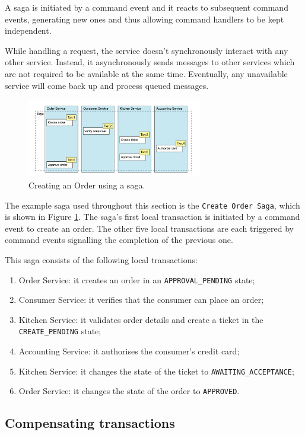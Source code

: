 \documentclass[conference]{IEEEtran}
\begin{document}
A saga is initiated by a command event and it reacts to subsequent command events, generating new ones and thus allowing command handlers to be kept independent.

While handling a request, the service doesn’t synchronously interact with any other service. Instead, it asynchronously sends messages to other services which are not required to be available at the same time. Eventually, any unavailable service will come back up and process queued messages.

\begin{figure}[!htbp]
\centering
\includegraphics[width=3in]{jpeg/order-saga}
\caption{Creating an Order using a saga. \cite{microservices-patterns-saga}}
\label{order_saga}
\end{figure}

The example saga used throughout this section is the \texttt{Create Order Saga}, which is shown in Figure \ref{order_saga}. The saga’s first local transaction is initiated by a command event to create an order. The other five local transactions are each triggered by command events signalling the completion of the previous one.

This saga consists of the following local transactions:

\begin{enumerate}
  \item Order Service: it creates an order in an \texttt{APPROVAL\_PENDING} state;
  \item Consumer Service: it verifies that the consumer can place an order;
  \item Kitchen Service: it validates order details and create a ticket in the \texttt{CREATE\_PENDING} state;
  \item Accounting Service: it authorises the consumer’s credit card;
  \item Kitchen Service: it changes the state of the ticket to \texttt{AWAITING\_ACCEPTANCE};
  \item Order Service: it changes the state of the order to \texttt{APPROVED}.
\end{enumerate}

\subsection{Compensating transactions}
\end{document}
